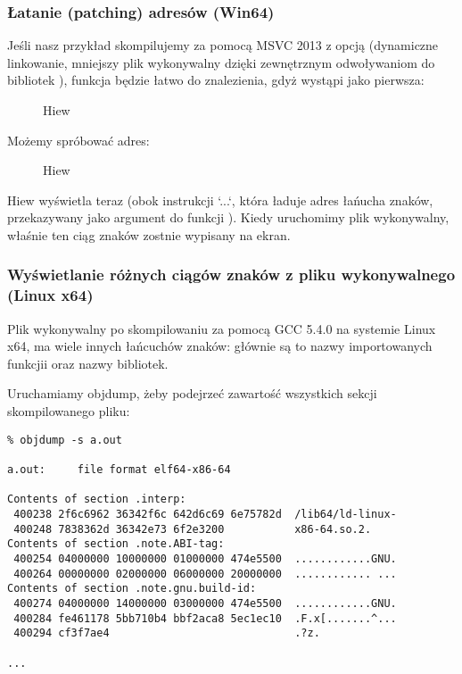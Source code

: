 \subsubsection{Łatanie (patching) adresów (Win64)}

Jeśli nasz przykład skompilujemy za pomocą MSVC 2013 z opcją 
(dynamiczne linkowanie, mniejszy plik wykonywalny dzięki zewnętrznym odwoływaniom do bibliotek ),
funkcja \main będzie łatwo do znalezienia, gdyż wystąpi jako pierwsza:

\begin{figure}[H]
\centering
{}
\caption{Hiew}
\label{}
\end{figure}

Możemy spróbować  adres:

\begin{figure}[H]
\centering
{}
\caption{Hiew}
\label{}
\end{figure}

Hiew wyświetla teraz  (obok instrukcji `\LEA \RCX ...`, która ładuje adres łańucha znaków, przekazywany jako argument do funkcji \printf).
Kiedy uruchomimy plik wykonywalny, właśnie ten ciąg znaków zostnie wypisany na ekran.

\subsubsection{Wyświetlanie różnych ciągów znaków z pliku wykonywalnego (Linux x64)}

Plik wykonywalny po skompilowaniu za pomocą GCC 5.4.0 na systemie Linux x64, ma wiele innych łańcuchów znaków:
głównie są to nazwy importowanych funkcjii oraz nazwy bibliotek.

Uruchamiamy objdump, żeby podejrzeć zawartość wszystkich sekcji skompilowanego pliku:

\begin{lstlisting}
% objdump -s a.out

a.out:     file format elf64-x86-64

Contents of section .interp:
 400238 2f6c6962 36342f6c 642d6c69 6e75782d  /lib64/ld-linux-
 400248 7838362d 36342e73 6f2e3200           x86-64.so.2.
Contents of section .note.ABI-tag:
 400254 04000000 10000000 01000000 474e5500  ............GNU.
 400264 00000000 02000000 06000000 20000000  ............ ...
Contents of section .note.gnu.build-id:
 400274 04000000 14000000 03000000 474e5500  ............GNU.
 400284 fe461178 5bb710b4 bbf2aca8 5ec1ec10  .F.x[.......^...
 400294 cf3f7ae4                             .?z.

...
\end{lstlisting}


